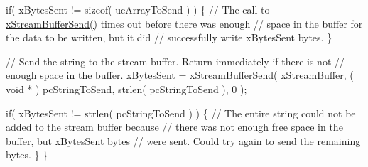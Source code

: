 \begin{DoxyPre}    if( xBytesSent != sizeof( ucArrayToSend ) )
    \{
        // The call to \mbox{\hyperlink{stream__buffer_8h_a35cdf3b6bf677086b9128782f762499d}{xStreamBufferSend()}} times out before there was enough
        // space in the buffer for the data to be written, but it did
        // successfully write xBytesSent bytes.
    \}\end{DoxyPre}



\begin{DoxyPre}    // Send the string to the stream buffer.  Return immediately if there is not
    // enough space in the buffer.
    xBytesSent = xStreamBufferSend( xStreamBuffer, ( void * ) pcStringToSend, strlen( pcStringToSend ), 0 );\end{DoxyPre}



\begin{DoxyPre}    if( xBytesSent != strlen( pcStringToSend ) )
    \{
        // The entire string could not be added to the stream buffer because
        // there was not enough free space in the buffer, but xBytesSent bytes
        // were sent.  Could try again to send the remaining bytes.
    \}
\}
\end{DoxyPre}
 
